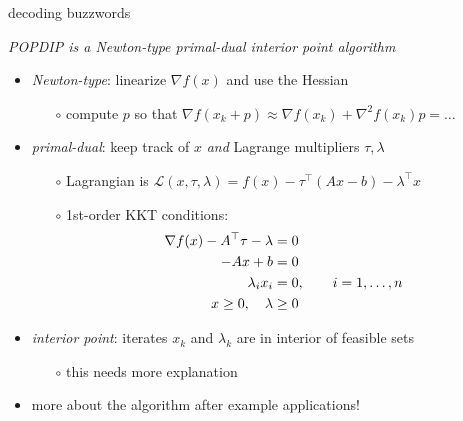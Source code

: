\documentclass[10pt,hyperref,dvipsnames]{beamer}
\newcommand{\grad}{\nabla}
\newcommand{\ds}{\displaystyle}
\begin{document}
\begin{frame}{decoding buzzwords}

\begin{center}
\emph{POPDIP is a {\color{BrickRed} Newton-type} {\color{OliveGreen} primal-dual} {\color{blue} interior point} algorithm}
\end{center}

\begin{itemize}
\item \emph{{\color{BrickRed} Newton-type}}: linearize $\grad f(x)$ and use the Hessian
    \begin{itemize}
    \item[$\circ$] compute $p$ so that $\grad f(x_k + p) \approx \grad f(x_k) + \grad^2 f(x_k) p = \dots$
    \end{itemize}
\item \emph{{\color{OliveGreen} primal-dual}}: keep track of $x$ \emph{and} Lagrange multipliers $\tau,\lambda$
    \begin{itemize}
    \item[$\circ$] Lagrangian is \qquad $\ds \mathcal{L}(x,\tau,\lambda) = f(x) - \tau^\top (Ax - b) - \lambda^\top x$
    \item[$\circ$] 1st-order KKT conditions:
\begin{align*}
\grad f(x) - A^\top \tau - \lambda &= 0 \\
-A x + b &= 0 \notag \\
\lambda_i x_i &=0, \qquad i=1,\dots,n \notag \\
x \ge 0, \quad \lambda &\ge 0 \notag
\end{align*}
    \end{itemize}
\item \emph{{\color{blue} interior point}}: iterates $x_k$ and $\lambda_k$ are in interior of feasible sets
    \begin{itemize}
    \item[$\circ$] this needs more explanation
    \end{itemize}

\medskip
\item more about the algorithm after example applications!
\end{itemize}
\end{frame}
\end{document}
